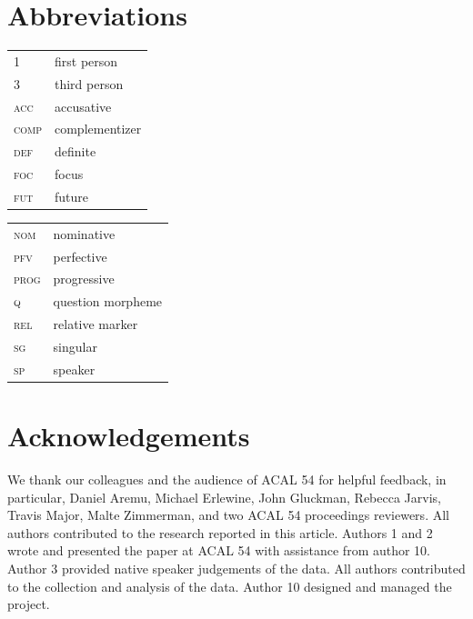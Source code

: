 \documentclass[output=paper,colorlinks,citecolor=brown
]{langscibook}
\begin{document}
\section*{Abbreviations}

\begin{tabularx}{.45\textwidth}{lQ}
\textsc{1} & first person\\
\textsc{3} & third person\\
\textsc{acc} & accusative\\
\textsc{comp} & complementizer\\
\textsc{def} & definite\\
\textsc{foc} & focus\\
\textsc{fut} & future\\
\end{tabularx}
\begin{tabularx}{.45\textwidth}{lQ}
\textsc{nom} & nominative\\
\textsc{pfv} & perfective\\
\textsc{prog} & progressive\\
\textsc{q} & question morpheme\\
\textsc{rel} & relative marker\\
\textsc{sg} & singular\\
\textsc{sp} & speaker
\end{tabularx}
\section*{Acknowledgements}

We thank our colleagues and the audience of ACAL 54 for helpful feedback, in particular, Daniel Aremu, Michael Erlewine, John Gluckman, Rebecca Jarvis, Travis Major, Malte Zimmerman, and two ACAL 54 proceedings reviewers. All authors contributed to the research reported in this article. Authors 1 and 2 wrote and presented the paper at ACAL 54 with assistance from author 10. Author 3 provided native speaker judgements of the data. All authors contributed to the collection and analysis of the data. Author 10 designed and managed the project.

\sloppy %

\printbibliography[heading=subbibliography,notkeyword=this]
\end{document}
